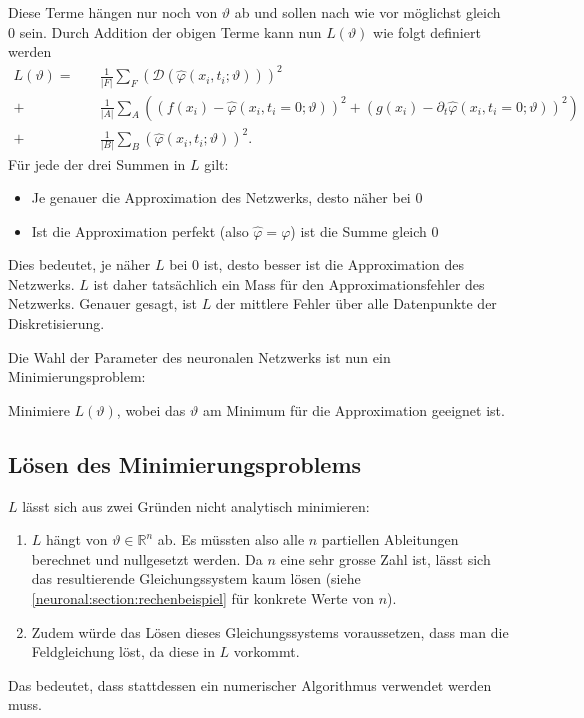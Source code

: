 Diese Terme hängen nur noch von $\vartheta$ ab und sollen nach wie vor möglichst gleich 0 sein.
Durch Addition der obigen Terme kann nun \( L(\vartheta) \) wie folgt definiert werden
\begin{equation}
    \begin{aligned}
        L(\vartheta) =\quad &\frac{1}{\lvert F \rvert} \sum_{F}^{} \left(\mathcal{D}(\hat{\varphi}(x_i, t_i; \vartheta))\right)^2\\
        + &\frac{1}{\lvert A \rvert} \sum_{A}^{} \left(\left(f(x_i) - \hat{\varphi}(x_i, t_i = 0; \vartheta)\right)^2
        + \left(g(x_i) - \partial_t \hat{\varphi}(x_i, t_i = 0; \vartheta)\right)^2\right)\\
        + &\frac{1}{\lvert B \rvert} \sum_{B}^{} \left(\hat{\varphi}(x_i, t_i; \vartheta)\right)^2.
    \end{aligned}
    \label{neuronal:optimierung}
\end{equation}
Für jede der drei Summen in \( L \) gilt:
\begin{itemize}
    \item Je genauer die Approximation des Netzwerks, desto näher bei 0
    \item Ist die Approximation perfekt (also \( \hat{\varphi} = \varphi \)) ist die Summe gleich 0
\end{itemize}
Dies bedeutet, je näher \( L \) bei 0 ist, desto besser ist die Approximation des Netzwerks.
$L$ ist daher tatsächlich ein Mass für den Approximationsfehler des Netzwerks.
Genauer gesagt, ist $L$ der mittlere Fehler über alle Datenpunkte der Diskretisierung.

Die Wahl der Parameter des neuronalen Netzwerks ist nun ein Minimierungsproblem:
\begin{aufgabe}
    Minimiere $L(\vartheta)$, wobei das $\vartheta$ am Minimum für die Approximation geeignet ist.
\end{aufgabe}

\subsection{Lösen des Minimierungsproblems}\label{neuronal:subsection:lösen_optimierungsproblem}
\( L \) lässt sich aus zwei Gründen nicht analytisch minimieren:
\begin{enumerate}
    \item \( L \) hängt von \( \vartheta \in \mathbb{R}^n \) ab. 
    Es müssten also alle \( n \) partiellen Ableitungen berechnet und nullgesetzt werden. 
    Da \( n \) eine sehr grosse Zahl ist, lässt sich das resultierende Gleichungssystem kaum lösen (siehe \ref{neuronal:section:rechenbeispiel} für konkrete Werte von $n$).
    \item Zudem würde das Lösen dieses Gleichungssystems voraussetzen, dass man die Feldgleichung löst, da diese in $L$ vorkommt.
\end{enumerate}
Das bedeutet, dass stattdessen ein numerischer Algorithmus verwendet werden muss.

